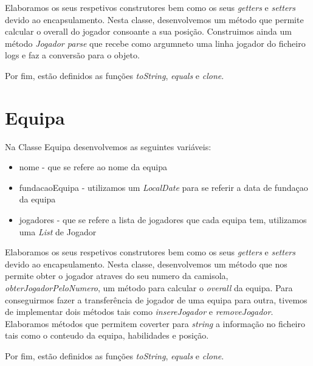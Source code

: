 \documentclass[a4paper,12pt]{article}
\begin{document}
    Elaboramos os seus respetivos construtores bem como os seus \emph{getters} e \emph{setters} devido ao encapsulamento.
Nesta classe, desenvolvemos um método que permite calcular o overall do jogador consoante a sua posição. Construimos
ainda um método \emph{ Jogador parse} que recebe como argumneto uma linha jogador do ficheiro logs e faz a conversão para
o objeto.\par
    Por fim, estão definidos as funções \emph{toString}, \emph{equals} e \emph{clone}. \par

\section{Equipa}
    Na Classe Equipa desenvolvemos as seguintes variáveis:
    \begin{itemize}
        \item nome - que se refere ao nome da equipa
        \item fundacaoEquipa - utilizamos um \emph{LocalDate} para se referir a data de fundaçao da equipa
        \item jogadores - que se refere a lista de jogadores que cada equipa tem, utilizamos uma \emph{List} de Jogador
    \end{itemize}

    Elaboramos os seus respetivos construtores bem como os seus \emph{getters} e \emph{setters} devido ao encapsulamento.
Nesta classe, desenvolvemos um método que nos permite obter o jogador atraves do seu numero da camisola,
\emph{obterJogadorPeloNumero}, um método para calcular o \emph{overall} da equipa. Para conseguirmos fazer a
transferência de jogador de uma equipa para outra, tivemos de implementar dois métodos tais como \emph{insereJogador} e
\emph{removeJogador}. Elaboramos métodos que permitem coverter para \emph{string} a informação no ficheiro tais como o
conteudo da equipa, habilidades e posição. \par
    Por fim, estão definidos as funções \emph{toString}, \emph{equals} e \emph{clone}. \par
\end{document}
